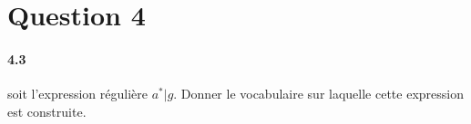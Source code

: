 \documentclass[a4paper,10pt]{article}
\begin{document}
\section{Question 4}
\paragraph{4.3}
 soit l'expression r\'{e}guli\`{e}re $a^{*} | g$. Donner le vocabulaire sur laquelle cette expression est construite.
\end{document}
